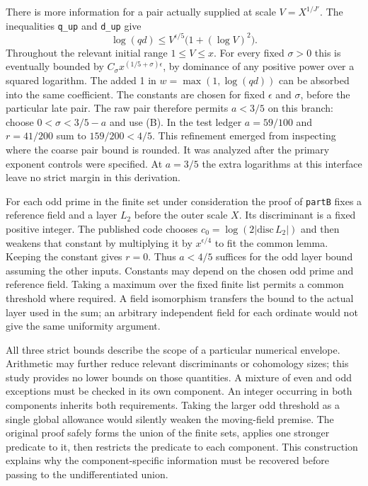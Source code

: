 \documentclass[12pt,letterpaper]{article}
\begin{document}
There is more information for a pair actually supplied at scale \(V=X^{1/J'}\). The inequalities \texttt{q\_up} and \texttt{d\_up} give
\[
        \log(qd)\le V^{\epsilon/5}\bigl(1+(\log V)^2\bigr).
\]
Throughout the relevant initial range \(1\le V\le x\). For every fixed \(\sigma>0\) this is eventually bounded by \(C_\sigma x^{(1/5+\sigma)\epsilon}\), by dominance of any positive power over a squared logarithm. The added 1 in \(w=\max(1,\log(qd))\) can be absorbed into the same coefficient. The constants are chosen for fixed \(\epsilon\) and \(\sigma\), before the particular late pair. The raw pair therefore permits \(a<3/5\) on this branch: choose \(0<\sigma<3/5-a\) and use (B). In the test ledger \(a=59/100\) and \(r=41/200\) sum to \(159/200<4/5\). This refinement emerged from inspecting where the coarse pair bound is rounded. It was analyzed after the primary exponent controls were specified. At \(a=3/5\) the extra logarithms at this interface leave no strict margin in this derivation.  

For each odd prime in the finite set under consideration the proof of \texttt{partB} fixes a reference field and a layer \(L_2\) before the outer scale \(X\). Its discriminant is a fixed positive integer. The published code chooses \(c_0=\log(2|\mathrm{disc}\,L_2|)\) and then weakens that constant by multiplying it by \(x^{\epsilon/4}\) to fit the common lemma. Keeping the constant gives \(r=0\). Thus \(a<4/5\) suffices for the odd layer bound assuming the other inputs. Constants may depend on the chosen odd prime and reference field. Taking a maximum over the fixed finite list permits a common threshold where required. A field isomorphism transfers the bound to the actual layer used in the sum; an arbitrary independent field for each ordinate would not give the same uniformity argument.  

All three strict bounds describe the scope of a particular numerical envelope. Arithmetic may further reduce relevant discriminants or cohomology sizes; this study provides no lower bounds on those quantities. A mixture of even and odd exceptions must be checked in its own component. An integer occurring in both components inherits both requirements. Taking the larger odd threshold as a single global allowance would silently weaken the moving-field premise. The original proof safely forms the union of the finite sets, applies one stronger predicate to it, then restricts the predicate to each component. This construction explains why the component-specific information must be recovered before passing to the undifferentiated union. 
\end{document}
